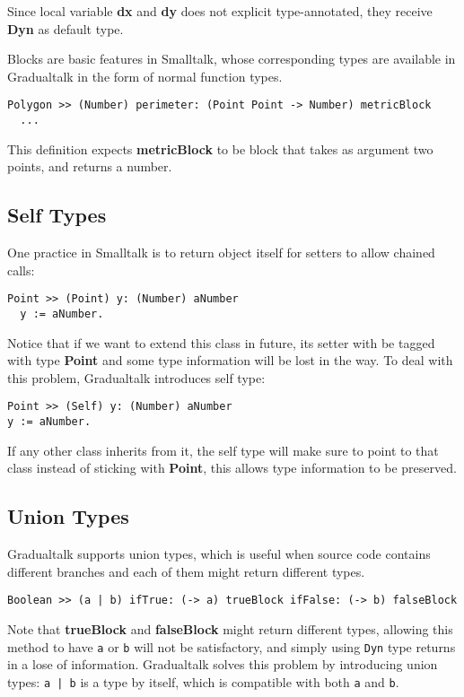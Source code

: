 Since local variable \textbf{dx} and \textbf{dy} does not explicit type-annotated,
they receive \textbf{Dyn} as default type.

Blocks are basic features in Smalltalk,
whose corresponding types are available in Gradualtalk in the form of normal function types.

\begin{verbatim}
Polygon >> (Number) perimeter: (Point Point -> Number) metricBlock
  ...
\end{verbatim}

This definition expects \textbf{metricBlock} to be block
that takes as argument two points, and returns a number.

\subsection{Self Types}

One practice in Smalltalk is to return object itself for setters
to allow chained calls:

\begin{verbatim}
Point >> (Point) y: (Number) aNumber
  y := aNumber.
\end{verbatim}

Notice that if we want to extend this class in future,
its setter with be tagged with type \textbf{Point} and some
type information will be lost in the way.
To deal with this problem, Gradualtalk introduces self type:

\begin{verbatim}
Point >> (Self) y: (Number) aNumber
y := aNumber.
\end{verbatim}

If any other class inherits from it, the self type will make sure
to point to that class instead of sticking with \textbf{Point},
this allows type information to be preserved.

\subsection{Union Types}

Gradualtalk supports union types, which is useful when
source code contains different branches and each of them might return different types.

\begin{verbatim}
Boolean >> (a | b) ifTrue: (-> a) trueBlock ifFalse: (-> b) falseBlock
\end{verbatim}

Note that \textbf{trueBlock} and \textbf{falseBlock} might return
different types, allowing this method to have \texttt{a} or \texttt{b}
will not be satisfactory, and simply using \texttt{Dyn} type
returns in a lose of information.
Gradualtalk solves this problem by introducing union types: \texttt{a | b}
is a type by itself, which is compatible with both \texttt{a} and \texttt{b}.


